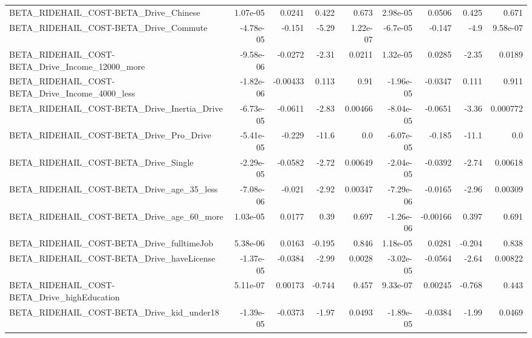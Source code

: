\begin{tabular}{lrrrrrrrr}
BETA\_RIDEHAIL\_COST-BETA\_Drive\_Chinese              &    1.07e-05 &       0.0241 &    0.422 &    0.673 &   2.98e-05 &      0.0506 &        0.425 &         0.671 \\
BETA\_RIDEHAIL\_COST-BETA\_Drive\_Commute              &   -4.78e-05 &       -0.151 &    -5.29 & 1.22e-07 &   -6.7e-05 &      -0.147 &         -4.9 &      9.58e-07 \\
BETA\_RIDEHAIL\_COST-BETA\_Drive\_Income\_12000\_more    &   -9.58e-06 &      -0.0272 &    -2.31 &   0.0211 &   1.32e-05 &      0.0285 &        -2.35 &        0.0189 \\
BETA\_RIDEHAIL\_COST-BETA\_Drive\_Income\_4000\_less     &   -1.82e-06 &     -0.00433 &    0.113 &     0.91 &  -1.96e-05 &     -0.0347 &        0.111 &         0.911 \\
BETA\_RIDEHAIL\_COST-BETA\_Drive\_Inertia\_Drive        &   -6.73e-05 &      -0.0611 &    -2.83 &  0.00466 &  -8.04e-05 &     -0.0651 &        -3.36 &      0.000772 \\
BETA\_RIDEHAIL\_COST-BETA\_Drive\_Pro\_Drive            &   -5.41e-05 &       -0.229 &    -11.6 &      0.0 &  -6.07e-05 &      -0.185 &        -11.1 &           0.0 \\
BETA\_RIDEHAIL\_COST-BETA\_Drive\_Single               &   -2.29e-05 &      -0.0582 &    -2.72 &  0.00649 &  -2.04e-05 &     -0.0392 &        -2.74 &       0.00618 \\
BETA\_RIDEHAIL\_COST-BETA\_Drive\_age\_35\_less          &   -7.08e-06 &       -0.021 &    -2.92 &  0.00347 &  -7.29e-06 &     -0.0165 &        -2.96 &       0.00309 \\
BETA\_RIDEHAIL\_COST-BETA\_Drive\_age\_60\_more          &    1.03e-05 &       0.0177 &     0.39 &    0.697 &  -1.26e-06 &    -0.00166 &        0.397 &         0.691 \\
BETA\_RIDEHAIL\_COST-BETA\_Drive\_fulltimeJob          &    5.38e-06 &       0.0163 &   -0.195 &    0.846 &   1.18e-05 &      0.0281 &       -0.204 &         0.838 \\
BETA\_RIDEHAIL\_COST-BETA\_Drive\_haveLicense          &   -1.37e-05 &      -0.0384 &    -2.99 &   0.0028 &  -3.02e-05 &     -0.0564 &        -2.64 &       0.00822 \\
BETA\_RIDEHAIL\_COST-BETA\_Drive\_highEducation        &    5.11e-07 &      0.00173 &   -0.744 &    0.457 &   9.33e-07 &     0.00245 &       -0.768 &         0.443 \\
BETA\_RIDEHAIL\_COST-BETA\_Drive\_kid\_under18          &   -1.39e-05 &      -0.0373 &    -1.97 &   0.0493 &  -1.89e-05 &     -0.0384 &        -1.99 &        0.0469 \\

\end{tabular}
